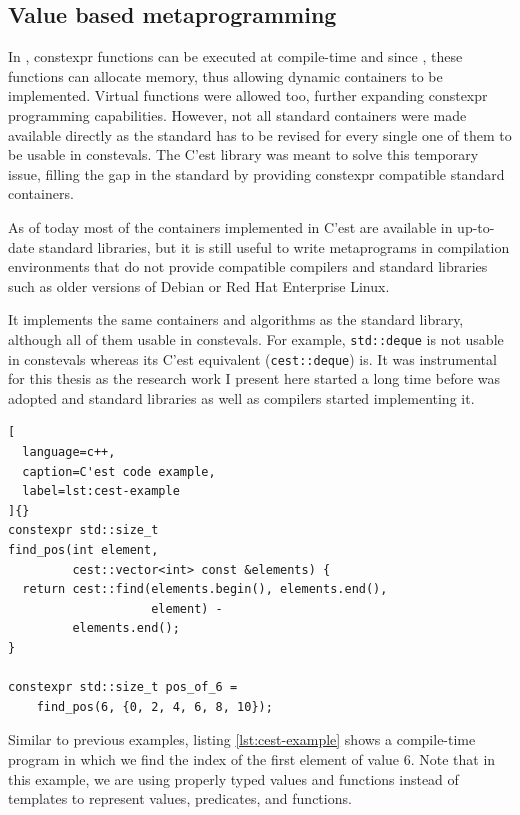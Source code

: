 \documentclass[../main]{subfiles}
\begin{document}
\subsection{
  Value based metaprogramming
}

In \cpp, \gls{constexpr} functions can be executed at compile-time and since
, these functions can allocate memory, thus allowing dynamic containers
to be implemented. Virtual functions were allowed too, further expanding
\gls{constexpr} programming capabilities.
However, not all standard containers were made available directly as
the standard has to be revised for every single one of them to be
usable in \glspl{consteval}. The C'est \cite{cest} library was meant to solve
this temporary issue, filling the gap in the \cpp standard by providing
\gls{constexpr} compatible standard containers.

As of today most of the containers implemented in C'est are available in
up-to-date standard libraries, but it is still useful to write metaprograms
in compilation environments that do not provide  compatible compilers
and standard libraries such as older versions of Debian
or Red Hat Enterprise Linux.

It implements the same containers and algorithms as the \cpp standard library,
although all of them usable in \glspl{consteval}. For example,
\lstinline{std::deque} is not usable in \glspl{consteval} whereas
its C'est equivalent (\lstinline{cest::deque}) is.
It was instrumental for this thesis as the research work I present here started
a long time before  was adopted and standard libraries as well as
compilers started implementing it.

\begin{lstlisting}[
  language=c++,
  caption=C'est code example,
  label=lst:cest-example
]{}
constexpr std::size_t
find_pos(int element,
         cest::vector<int> const &elements) {
  return cest::find(elements.begin(), elements.end(),
                    element) -
         elements.end();
}

constexpr std::size_t pos_of_6 =
    find_pos(6, {0, 2, 4, 6, 8, 10});
\end{lstlisting}

Similar to previous examples, listing \ref{lst:cest-example} shows a
compile-time program in which we find the index of the first element of value 6.
Note that in this example, we are using properly typed values and functions
instead of templates to represent values, predicates, and functions.
\end{document}
